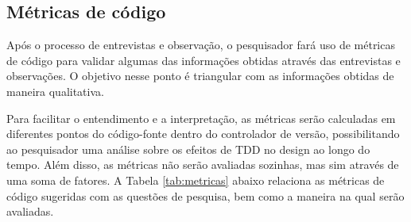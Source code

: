 \subsection{Métricas de código}
\label{sec:planejamento-metricas}

Após o processo de entrevistas e observação, o pesquisador fará uso de métricas
de código para validar algumas das informações obtidas através das entrevistas e
observações. O objetivo nesse ponto é triangular com as informações obtidas
de maneira qualitativa. 

Para facilitar o entendimento e a interpretação, as métricas
serão calculadas em diferentes pontos do código-fonte dentro do controlador de versão,
possibilitando ao pesquisador uma análise sobre os efeitos de TDD no design ao
longo do tempo. Além disso, as métricas não serão avaliadas sozinhas, mas sim
através de uma soma de fatores. 
A Tabela \ref{tab:metricas} abaixo relaciona as métricas de código sugeridas com
as questões de pesquisa, bem como a maneira na qual serão avaliadas.

